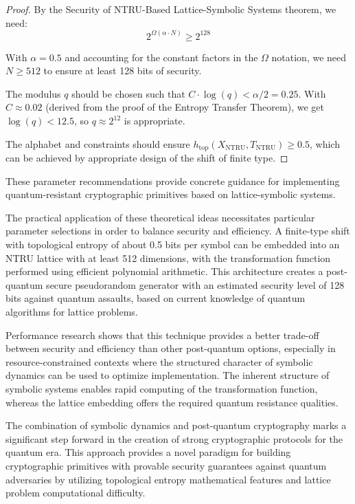 \documentclass[12pt,a4paper]{article}
\begin{document}
\begin{proof}
By the Security of NTRU-Based Lattice-Symbolic Systems theorem, we need:
\begin{equation}
2^{\Omega(\alpha \cdot N)} \geq 2^{128}
\end{equation}

With $\alpha = 0.5$ and accounting for the constant factors in the $\Omega$ notation, we need $N \geq 512$ to ensure at least 128 bits of security.

The modulus $q$ should be chosen such that $C \cdot \log(q) < \alpha/2 = 0.25$. With $C \approx 0.02$ (derived from the proof of the Entropy Transfer Theorem), we get $\log(q) < 12.5$, so $q \approx 2^{12}$ is appropriate.

The alphabet and constraints should ensure $h_{\text{top}}(X_{\text{NTRU}}, T_{\text{NTRU}}) \geq 0.5$, which can be achieved by appropriate design of the shift of finite type.
\end{proof}

These parameter recommendations provide concrete guidance for implementing quantum-resistant cryptographic primitives based on lattice-symbolic systems.

The practical application of these theoretical ideas necessitates particular parameter selections in order to balance security and efficiency. A finite-type shift with topological entropy of about 0.5 bits per symbol can be embedded into an NTRU lattice with at least 512 dimensions, with the transformation function performed using efficient polynomial arithmetic. This architecture creates a post-quantum secure pseudorandom generator with an estimated security level of 128 bits against quantum assaults, based on current knowledge of quantum algorithms for lattice problems.

Performance research shows that this technique provides a better trade-off between security and efficiency than other post-quantum options, especially in resource-constrained contexts where the structured character of symbolic dynamics can be used to optimize implementation.  The inherent structure of symbolic systems enables rapid computing of the transformation function, whereas the lattice embedding offers the required quantum resistance qualities.

 The combination of symbolic dynamics and post-quantum cryptography marks a significant step forward in the creation of strong cryptographic protocols for the quantum era.  This approach provides a novel paradigm for building cryptographic primitives with provable security guarantees against quantum adversaries by utilizing topological entropy mathematical features and lattice problem computational difficulty.
\end{document}
